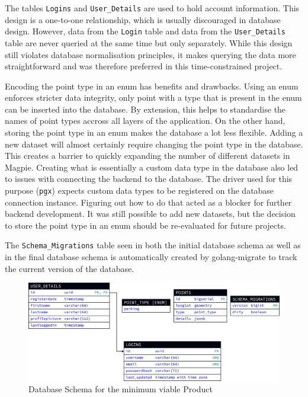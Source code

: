The tables \texttt{Logins} and \texttt{User\_Details} are used to hold account
information. This design is a one-to-one relationship, which is usually
discouraged in database design. However, data from the \texttt{Login} table and
data from the \texttt{User\_Details} table are never queried at the same time
but only separately. While this design still violates database normalisation
principles, it makes querying the data more straightforward and was therefore
preferred in this time-constrained project.

Encoding the point type in an enum has benefits and drawbacks. Using an enum
enforces stricter data integrity, only point with a type that is present in the
enum can be inserted into the database. By extension, this helps to standardise
the names of point types accross all layers of the application. On the other
hand, storing the point type in an enum makes the database a lot less flexible.
Adding a new dataset will almost certainly require changing the point type in
the database. This creates a barrier to quickly expanding the number of
different datasets in Magpie. Creating what is essentially a custom data type in
the database also led to issues with connecting the backend to the database. The
driver used for this purpose (\texttt{pgx}) expects custom data types to be
registered on the database connection instance. Figuring out how to do that
acted as a blocker for further backend development. It was still possible to add
new datasets, but the decision to store the point type in an enum should be
re-evaluated for future projects.

The \texttt{Schema\_Migrations} table seen in both the initial database schema
as well as in the final database schema is automatically created by
golang-migrate to track the current version of the database.

\begin{figure}[htbp]
  \centering{}
  \includegraphics[width=\textwidth]{../d2-diagrams/database-init/database-init.png}
  \caption{Database Schema for the minimum viable Product}
  \label{fig:database_init_schema}
\end{figure}

